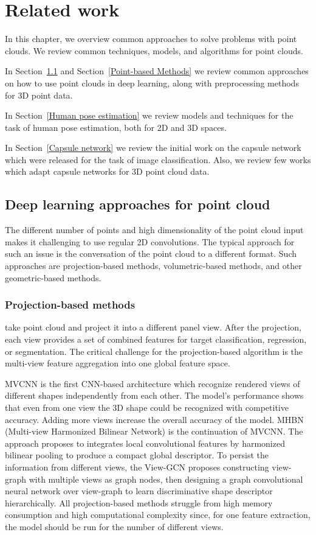 \chapter{Related work}
\label{Related work}

In this chapter, we overview common approaches to solve problems with point clouds. We review common techniques, models, and algorithms for point clouds.

In Section~\ref{Deep learning approaches for point cloud} and Section~\ref{Point-based Methods} we review common approaches on how to use point clouds in deep learning, along with preprocessing methods for 3D point data.

In Section~\ref{Human pose estimation} we review models and techniques for the task of human pose estimation, both for 2D and 3D spaces.

In Section~\ref{Capsule network} we review the initial work on the capsule network which were released for the task of image classification. Also, we review few works which adapt capsule networks for 3D point cloud data.

\section{Deep learning approaches for point cloud}
\label{Deep learning approaches for point cloud}
The different number of points and high dimensionality of the point cloud input makes it challenging to use regular 2D convolutions. The typical approach for such an issue is the conversation of the point cloud to a different format. Such approaches are projection-based methods, volumetric-based methods, and other geometric-based methods.
\subsection{Projection-based methods} take point cloud and project it into a different panel view. After the projection, each view provides a set of combined features for target classification, regression, or segmentation. The critical challenge for the projection-based algorithm is the multi-view feature aggregation into one global feature space.

MVCNN \parencite{su_multi-view_2015} is the first CNN-based architecture which recognize rendered views of different shapes independently from each other. The model's performance shows that even from one view the 3D shape could be recognized with competitive accuracy. Adding more views increase the overall accuracy of the model.
MHBN \parencite{yu_multi-view_2018} (Multi-view Harmonized Bilinear Network) is the continuation of MVCNN. The approach proposes to integrates local convolutional features by harmonized bilinear pooling to produce a compact global descriptor.
To persist the information from different views, the View-GCN \parencite{wei_view-gcn_2020} proposes constructing view-graph with multiple views as graph nodes, then designing a graph convolutional neural network over view-graph to learn discriminative shape descriptor hierarchically.
All projection-based methods struggle from high memory consumption and high computational complexity since, for one feature extraction, the model should be run for the number of different views.

